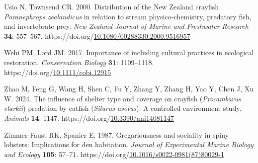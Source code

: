 \documentclass[
  letterpaper,
  DIV=11,
  numbers=noendperiod]{scrartcl}
\newlength{\cslhangindent}
\newenvironment{CSLReferences}[2] %
 {\begin{list}{}{%
  \setlength{\itemindent}{0pt}
  \setlength{\leftmargin}{0pt}
  \setlength{\parsep}{0pt}
  \ifodd #1
   \setlength{\leftmargin}{\cslhangindent}
   \setlength{\itemindent}{-1\cslhangindent}
  \fi
  \setlength{\itemsep}{#2\baselineskip}}}
 {\end{list}}
\begin{document}
\begin{CSLReferences}{1}{0}
Usio N, Townsend CR. 2000. Distribution of the {New Zealand} crayfish
{\emph{Paranephrops zealandicus}} in relation to stream
physico‐chemistry, predatory fish, and invertebrate prey. \emph{New
Zealand Journal of Marine and Freshwater Research} \textbf{34}:
557--567.
https://doi.org/\href{https://doi.org/10.1080/00288330.2000.9516957}{10.1080/00288330.2000.9516957}

Wehi PM, Lord JM. 2017. Importance of including cultural practices in
ecological restoration. \emph{Conservation Biology} \textbf{31}:
1109--1118.
https://doi.org/\href{https://doi.org/10.1111/cobi.12915}{10.1111/cobi.12915}

Zhao M, Feng G, Wang H, Shen C, Fu Y, Zhang Y, Zhang H, Yao Y, Chen J,
Xu W. 2024. The influence of shelter type and coverage on crayfish
({\emph{Procambarus clarkii}}) predation by catfish ({\emph{Silurus
asotus}}): A controlled environment study. \emph{Animals} \textbf{14}:
1147.
https://doi.org/\href{https://doi.org/10.3390/ani14081147}{10.3390/ani14081147}

Zimmer-Faust RK, Spanier E. 1987. Gregariousness and sociality in spiny
lobsters: Implications for den habitation. \emph{Journal of Experimental
Marine Biology and Ecology} \textbf{105}: 57--71.
https://doi.org/\href{https://doi.org/10.1016/s0022-0981(87)80029-1}{10.1016/s0022-0981(87)80029-1}

\end{CSLReferences}
\end{document}
